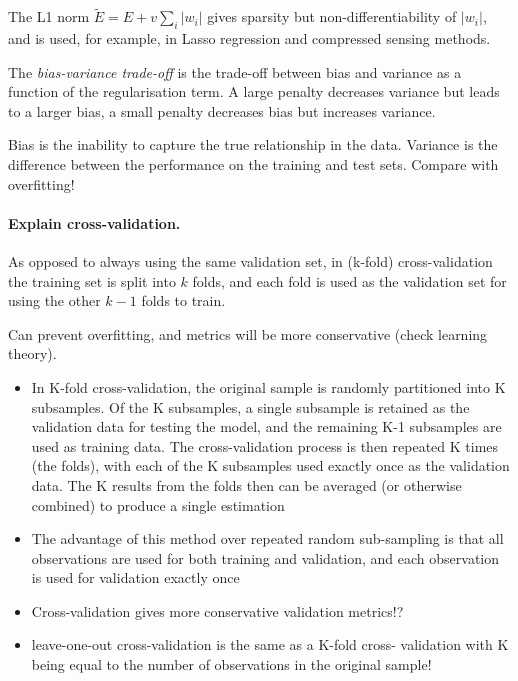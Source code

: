 The L1 norm $\tilde{E} = E + v \sum_i{\lvert w_i \rvert}$
gives sparsity but non-differentiability of $\lvert w_i \rvert$,
and is used, for example, in Lasso regression and compressed sensing methods.

The \textit{bias-variance trade-off} is the trade-off between bias and variance as a function of the regularisation term.
A large penalty decreases variance but leads to a larger bias,
a small penalty decreases bias but increases variance.

Bias is the inability to capture the true relationship in the data.
Variance is the difference between the performance on the training
and test sets. Compare with overfitting!

\paragraph{Explain cross-validation.}

As opposed to always using the same validation set, in (k-fold) cross-validation
the training set is split into $k$ folds, and each fold is used as the validation set
for using the other $k-1$ folds to train.

Can prevent overfitting, and metrics will be more conservative (check learning theory).

\begin{itemize}
    \item In K-fold cross-validation, the original sample is randomly
    partitioned into K subsamples. Of the K subsamples, a single
    subsample is retained as the validation data for testing the model,
    and the remaining K-1 subsamples are used as training data.
    The cross-validation process is then repeated K times (the folds),
    with each of the K subsamples used exactly once as the validation
    data. The K results from the folds then can be averaged (or
    otherwise combined) to produce a single estimation
    \item The advantage of this method over repeated random sub-sampling
    is that all observations are used for both training and validation,
    and each observation is used for validation exactly once
    \item Cross-validation gives more conservative validation metrics!?
    \item leave-one-out cross-validation is the same as a K-fold cross-
    validation with K being equal to the number of observations in the
    original sample!
\end{itemize}

